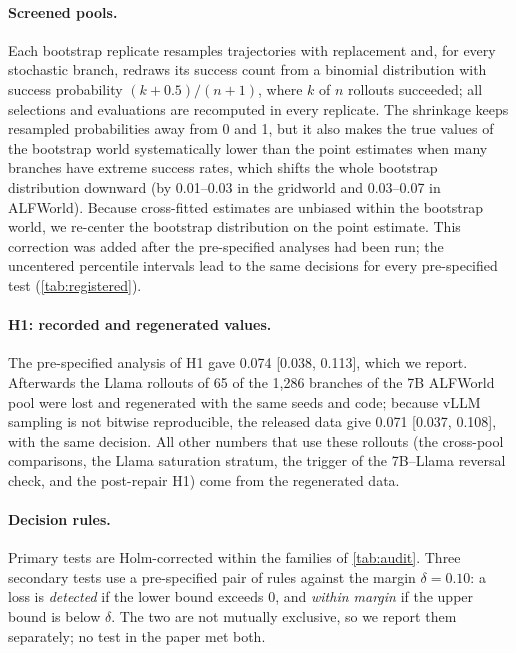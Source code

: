 \documentclass{article}
\theoremstyle{plain}
\theoremstyle{definition}
\theoremstyle{remark}
\begin{document}
\paragraph{Screened pools.} Each bootstrap replicate resamples trajectories with replacement and, for every stochastic branch, redraws its success count from a binomial distribution with success probability $(k+0.5)/(n+1)$, where $k$ of $n$ rollouts succeeded; all selections and evaluations are recomputed in every replicate. The shrinkage keeps resampled probabilities away from 0 and 1, but it also makes the true values of the bootstrap world systematically lower than the point estimates when many branches have extreme success rates, which shifts the whole bootstrap distribution downward (by 0.01--0.03 in the gridworld and 0.03--0.07 in ALFWorld). Because cross-fitted estimates are unbiased within the bootstrap world, we re-center the bootstrap distribution on the point estimate. This correction was added after the pre-specified analyses had been run; the uncentered percentile intervals lead to the same decisions for every pre-specified test (\cref{tab:registered}).

\paragraph{H1: recorded and regenerated values.} The pre-specified analysis of H1 gave 0.074 [0.038, 0.113], which we report. Afterwards the Llama rollouts of 65 of the 1,286 branches of the 7B ALFWorld pool were lost and regenerated with the same seeds and code; because vLLM sampling is not bitwise reproducible, the released data give 0.071 [0.037, 0.108], with the same decision. All other numbers that use these rollouts (the cross-pool comparisons, the Llama saturation stratum, the trigger of the 7B--Llama reversal check, and the post-repair H1) come from the regenerated data.

\paragraph{Decision rules.} Primary tests are Holm-corrected within the families of \cref{tab:audit}. Three secondary tests use a pre-specified pair of rules against the margin $\delta=0.10$: a loss is \emph{detected} if the lower bound exceeds 0, and \emph{within margin} if the upper bound is below $\delta$. The two are not mutually exclusive, so we report them separately; no test in the paper met both.
\end{document}
